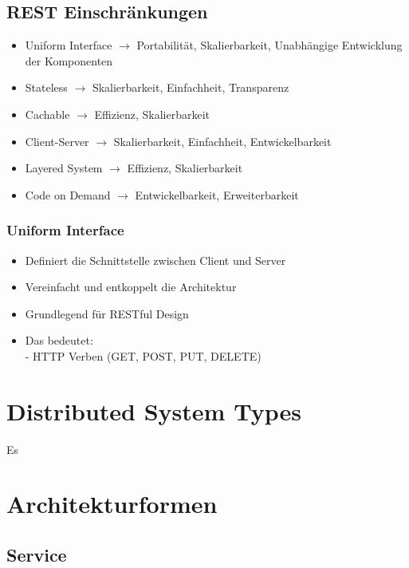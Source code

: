 \documentclass{report}
\theoremstyle{definition}
\theoremstyle{example}
\begin{document}
\subsection{REST Einschränkungen}
\begin{itemize}
\item Uniform Interface $\rightarrow$ Portabilität, Skalierbarkeit, Unabhängige Entwicklung der Komponenten
\item Stateless $\rightarrow$ Skalierbarkeit, Einfachheit, Transparenz
\item Cachable $\rightarrow$ Effizienz, Skalierbarkeit
\item Client-Server $\rightarrow$ Skalierbarkeit, Einfachheit, Entwickelbarkeit
\item Layered System $\rightarrow$ Effizienz, Skalierbarkeit
\item Code on Demand $\rightarrow$ Entwickelbarkeit, Erweiterbarkeit
\end{itemize}

\subsubsection{Uniform Interface}
\begin{itemize}
\item Definiert die Schnittstelle zwischen Client und Server
\item Vereinfacht und entkoppelt die Architektur
\item Grundlegend für RESTful Design
\item Das bedeutet: \\
- HTTP Verben (GET, POST, PUT, DELETE) 
\end{itemize}
\section{Distributed System Types}
Es

\section{Architekturformen}
\subsection{Service}
\end{document}
